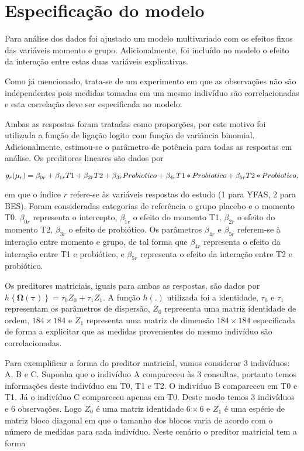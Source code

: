 
\section{Especificação do modelo}

Para análise dos dados foi ajustado um modelo multivariado com os efeitos fixos das variáveis momento e grupo. Adicionalmente, foi incluído no modelo o efeito da interação entre estas duas variáveis explicativas.

Como já mencionado, trata-se de um experimento em que as observações não são independentes pois medidas tomadas em um mesmo indivíduo são correlacionadas e esta correlação deve ser especificada no modelo. 

Ambas as respostas foram tratadas como proporções, por este motivo foi utilizada a função de ligação logito com função de variância binomial. Adicionalmente, estimou-se o parâmetro de potência para todas as respostas em análise. Os preditores lineares são dados por

$$
g_{r}(\mu_{r}) = \beta_{0r} + \beta_{1r} T1 + \beta_{2r} T2 + \beta_{3r} Probiotico + \\ \beta_{4r} T1*Probiotico + \beta_{5r} T2*Probiotico,
$$

\noindent em que o índice $r$ refere-se às variáveis respostas do estudo (1 para YFAS, 2 para BES). Foram consideradas categorias de referência o grupo placebo e o momento T0. $\beta_{0r}$ representa o intercepto, $\beta_{1r}$ o efeito do momento T1, $\beta_{2r}$ o efeito do momento T2, $\beta_{3r}$ o efeito de probiótico. Os parâmetros $\beta_{4r}$ e $\beta_{5r}$ referem-se à interação entre momento e grupo, de tal forma que $\beta_{4r}$ representa o efeito da interação entre T1 e probiótico, e $\beta_{5r}$ representa o efeito da interação entre T2 e probiótico.

Os preditores matriciais, iguais para ambas as respostas, são dados por $h\left \{ \boldsymbol{\Omega}(\boldsymbol{\tau}) \right \} = \tau_0Z_0 + \tau_1Z_1$. A função $h(.)$ utilizada foi a identidade, $\tau_0$ e $\tau_1$ representam os parâmetros de dispersão, $Z_0$ representa uma matriz identidade de ordem, $184 \times 184$ e $Z_1$ representa uma matriz de dimensão $184 \times 184$ especificada de forma a explicitar que as medidas provenientes do mesmo indivíduo são correlacionadas. 

Para exemplificar a forma do preditor matricial, vamos considerar 3 indivíduos: A, B e C. Suponha que o indivíduo A compareceu às 3 consultas, portanto temos informações deste indivíduo em T0, T1 e T2. O indivíduo B compareceu em T0 e T1. Já o indivíduo C compareceu apenas em T0. Deste modo temos 3 indivíduos e 6 observações. Logo $Z_0$ é uma matriz identidade $6 \times 6$ e $Z_1$ é uma espécie de matriz bloco diagonal em que o tamanho dos blocos varia de acordo com o número de medidas para cada indivíduo. Neste cenário o preditor matricial tem a forma


